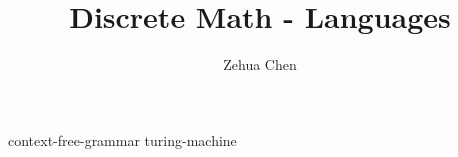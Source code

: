 \documentclass[letterpaper, 12pt]{report}
\title{Discrete Math - Languages}
\author{Zehua Chen}
\begin{document}
  \maketitle
  \tableofcontents

  {context-free-grammar}
  {turing-machine}
\end{document}
